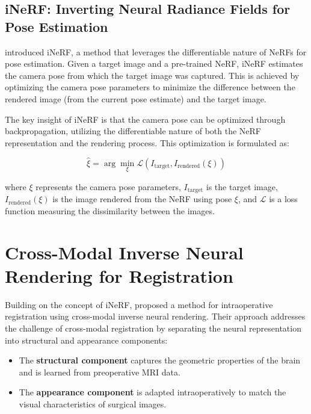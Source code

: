 \subsection{iNeRF: Inverting Neural Radiance Fields for Pose Estimation}

\textcite{yen2020inerf} introduced iNeRF, a method that leverages the differentiable nature of NeRFs for pose estimation. Given a target image and a pre-trained NeRF, iNeRF estimates the camera pose from which the target image was captured. This is achieved by optimizing the camera pose parameters to minimize the difference between the rendered image (from the current pose estimate) and the target image.

The key insight of iNeRF is that the camera pose can be optimized through backpropagation, utilizing the differentiable nature of both the NeRF representation and the rendering process. This optimization is formulated as:

\begin{equation}
    \hat{\xi} = \arg\min_{\xi} \mathcal{L}(I_{\text{target}}, I_{\text{rendered}}(\xi))
\end{equation}

where $\xi$ represents the camera pose parameters, $I_{\text{target}}$ is the target image, $I_{\text{rendered}}(\xi)$ is the image rendered from the NeRF using pose $\xi$, and $\mathcal{L}$ is a loss function measuring the dissimilarity between the images.

\section{Cross-Modal Inverse Neural Rendering for Registration}

Building on the concept of iNeRF, \textcite{fehrentz2024intraoperative} proposed a method for intraoperative registration using cross-modal inverse neural rendering. Their approach addresses the challenge of cross-modal registration by separating the neural representation into structural and appearance components:

\begin{itemize}
    \item The \textbf{structural component} captures the geometric properties of the brain and is learned from preoperative MRI data.
    
    \item The \textbf{appearance component} is adapted intraoperatively to match the visual characteristics of surgical images.
\end{itemize}

